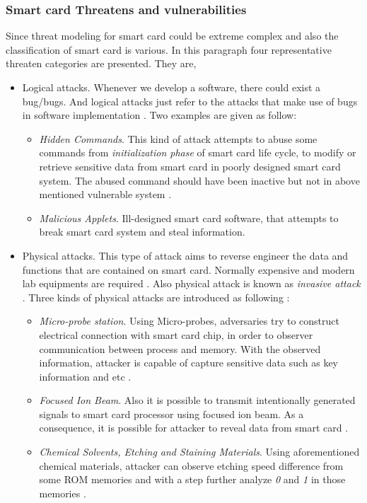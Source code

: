 \subsubsection{Smart card Threatens and vulnerabilities}
Since threat modeling for smart card could be extreme complex and also the classification of smart card is various. In this paragraph four representative threaten categories are presented. They are,
\begin{itemize}
\item Logical attacks. Whenever we develop a software, there could exist a bug/bugs. And logical attacks just refer to the attacks that make use of bugs in software implementation \cite{smart_card_attack2}. Two examples are given as follow:
\begin{itemize}
\item \emph{Hidden Commands}. This kind of attack attempts to abuse some commands from \emph{initialization phase} of smart card life cycle, to modify or retrieve sensitive data from smart card in poorly designed smart card system. The abused command should have been inactive but not in above mentioned vulnerable system \cite{smart_card_attack2}.
\item \emph{Malicious Applets}. Ill-designed smart card software, that attempts to break smart card system and steal information.
\end{itemize}
\item Physical attacks. This type of attack aims to reverse engineer the data and functions that are contained on smart card. Normally expensive and modern lab equipments are required \cite{smart_card_attack2}. Also physical attack is known as \emph{invasive attack} \cite{smart_card_attack3}. Three kinds of physical attacks are introduced as following :
\begin{itemize} 
\item \emph{Micro-probe station}. Using Micro-probes, adversaries try to construct electrical connection with smart card chip, in order to observer communication between process and memory. With the observed information, attacker is capable of capture sensitive data such as key information and etc \cite{smart_card_attack3}.
\item \emph{Focused Ion Beam}. Also it is possible to transmit intentionally generated signals to smart card processor using focused ion beam. As a consequence, it is possible for attacker to reveal data from smart card \cite{smart_card_attack3}.
\item \emph{Chemical Solvents, Etching and Staining Materials}. Using aforementioned chemical materials, attacker can observe etching speed difference from some ROM memories and with a step further analyze \emph{0} and \emph{1} in those memories \cite{smart_card_attack2}.

\end{itemize}
\end{itemize}
